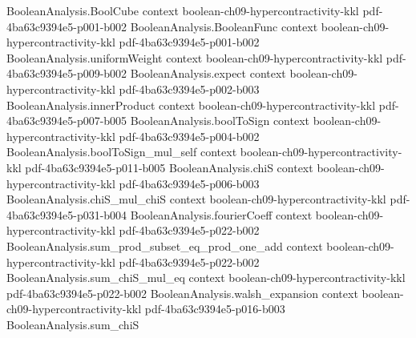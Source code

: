 \begin{theorem}
\leanok
{}
\label{BooleanAnalysis.Hypercontractivity.noise_operator_duality}
\proofstep
  {BooleanAnalysis.BoolCube}
  {context}
  {boolean-ch09-hypercontractivity-kkl}
  {pdf-4ba63c9394e5-p001-b002}
\proofstep
  {BooleanAnalysis.BooleanFunc}
  {context}
  {boolean-ch09-hypercontractivity-kkl}
  {pdf-4ba63c9394e5-p001-b002}
\proofstep
  {BooleanAnalysis.uniformWeight}
  {context}
  {boolean-ch09-hypercontractivity-kkl}
  {pdf-4ba63c9394e5-p009-b002}
\proofstep
  {BooleanAnalysis.expect}
  {context}
  {boolean-ch09-hypercontractivity-kkl}
  {pdf-4ba63c9394e5-p002-b003}
\proofstep
  {BooleanAnalysis.innerProduct}
  {context}
  {boolean-ch09-hypercontractivity-kkl}
  {pdf-4ba63c9394e5-p007-b005}
\proofstep
  {BooleanAnalysis.boolToSign}
  {context}
  {boolean-ch09-hypercontractivity-kkl}
  {pdf-4ba63c9394e5-p004-b002}
\proofstep
  {BooleanAnalysis.boolToSign_mul_self}
  {context}
  {boolean-ch09-hypercontractivity-kkl}
  {pdf-4ba63c9394e5-p011-b005}
\proofstep
  {BooleanAnalysis.chiS}
  {context}
  {boolean-ch09-hypercontractivity-kkl}
  {pdf-4ba63c9394e5-p006-b003}
\proofstep
  {BooleanAnalysis.chiS_mul_chiS}
  {context}
  {boolean-ch09-hypercontractivity-kkl}
  {pdf-4ba63c9394e5-p031-b004}
\proofstep
  {BooleanAnalysis.fourierCoeff}
  {context}
  {boolean-ch09-hypercontractivity-kkl}
  {pdf-4ba63c9394e5-p022-b002}
\proofstep
  {BooleanAnalysis.sum_prod_subset_eq_prod_one_add}
  {context}
  {boolean-ch09-hypercontractivity-kkl}
  {pdf-4ba63c9394e5-p022-b002}
\proofstep
  {BooleanAnalysis.sum_chiS_mul_eq}
  {context}
  {boolean-ch09-hypercontractivity-kkl}
  {pdf-4ba63c9394e5-p022-b002}
\proofstep
  {BooleanAnalysis.walsh_expansion}
  {context}
  {boolean-ch09-hypercontractivity-kkl}
  {pdf-4ba63c9394e5-p016-b003}
\proofstep
  {BooleanAnalysis.sum_chiS}

\end{theorem}

